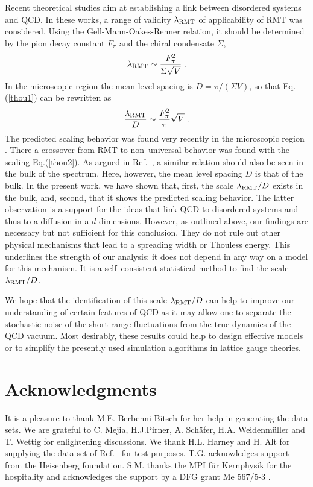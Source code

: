 Recent theoretical studies aim at establishing
\cite{stern98,osborn98,janik98} a link between disordered systems and
QCD. In these works, a range of validity $\lambda_{\rm RMT}$ of
applicability of RMT was considered.  Using the Gell-Mann-Oakes-Renner
relation, it should be determined by the pion decay constant $F_\pi$
and the chiral condensate $\Sigma$,
\begin{equation}
\lambda_{\rm RMT}\sim\frac{F_\pi^2}{\Sigma\sqrt{V}}\;.
\label{thou1}
\end{equation}
In the microscopic region the mean level spacing is
$D=\pi/(\Sigma V)$, so that Eq.(\ref{thou1}) can be rewritten as
\begin{equation}
\frac{\lambda_{\rm RMT}}{D}\sim\frac{F_\pi^2}{\pi}\sqrt{V}\;.
\label{thou2}
\end{equation}
The predicted scaling behavior was found very recently in the
microscopic region \cite{bitsch98}.  There a crossover from RMT to
non--universal behavior was found with the scaling Eq.(\ref{thou2}).
As argued in Ref.~\cite{osborn98}, a similar relation should also be
seen in the bulk of the spectrum. Here, however, the mean level
spacing $D$ is that of the bulk. In the present work, we have shown
that, first, the scale $\lambda_{\rm RMT}/D$ exists in the bulk, and,
second, that it shows the predicted scaling behavior.  The latter
observation is a support for the ideas that link QCD to disordered
systems and thus to a diffusion in a $d$ dimensions.  However, as
outlined above, our findings are necessary but not sufficient for this
conclusion. They do not rule out other physical mechanisms that lead
to a spreading width or Thouless energy. This underlines the strength
of our analysis: it does not depend in any way on a model for this
mechanism. It is a self--consistent statistical method to find the
scale $\lambda_{\rm RMT}/D$.

We hope that the identification of this scale $\lambda_{\rm RMT}/D$
can help to improve our understanding of certain features of QCD as it
may allow one to separate the stochastic noise of the short range
fluctuations from the true dynamics of the QCD vacuum. Most desirably,
these results could help to design effective models or to simplify the
presently used simulation algorithms in lattice gauge theories.



\section*{Acknowledgments}
It is a pleasure to thank M.E. Berbenni-Bitsch for her help in
generating the data sets.  We are grateful to C. Mejia, H.J.Pirner, A.
Sch\"afer, H.A.  Weidenm\"uller and T. Wettig for enlightening
discussions.  We thank H.L. Harney and H. Alt for supplying the data
set of Ref.~\cite{graef92} for test purposes. T.G. acknowledges support
from the Heisenberg foundation.  S.M. thanks the MPI f\"ur Kernphysik
for the hospitality and acknowledges the support by a DFG grant Me
567/5-3 .


